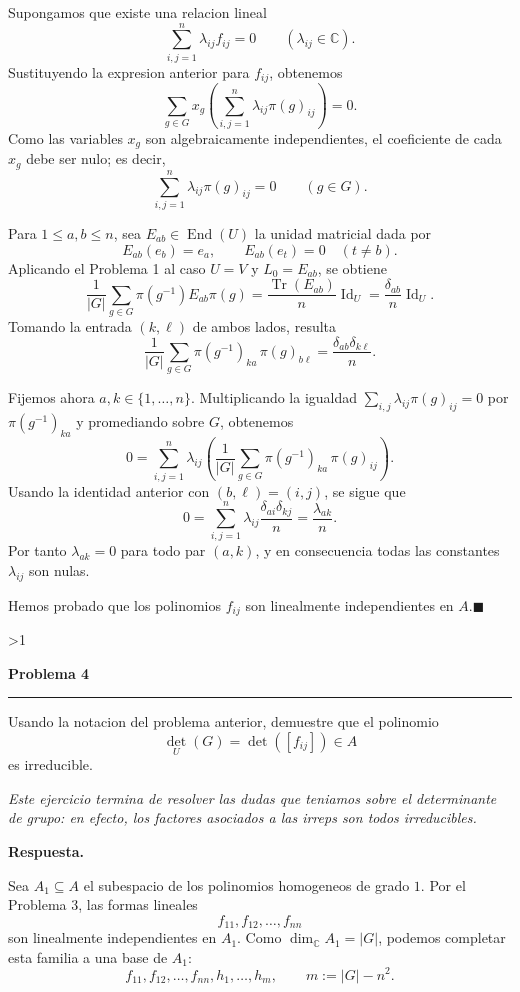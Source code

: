 \documentclass[10pt,a4paper]{article}
\newcommand{\CC}{\mathbb{C}}
\newcommand{\inlinehead}[2][repblue]{%
  \par\smallskip
  {\color{#1}\bfseries #2.}\hspace{0.45em}%
}
\newcommand{\answer}{\inlinehead{Respuesta}}
\newcounter{probcnt}
\newcommand{\problem}[2]{%
  \stepcounter{probcnt}%
  \ifnum\value{probcnt}>1\newpage\fi
  \par\vspace{0.25em}
  {\large\bfseries\color{repblue} Problema #1}\par
  {\color{repline}\rule{\linewidth}{0.55pt}}\par
  \begin{tcolorbox}[
    breakable,
    colback=white,
    colframe=repline,
    borderline west={1.6pt}{0pt}{repteal},
    left=0.7em,
    right=0.7em,
    top=0.35em,
    bottom=0.3em,
    before skip=0.35em,
    after skip=0.45em
  ]
    #2
  \end{tcolorbox}
}
\begin{document}
Supongamos que existe una relacion lineal
\[
  \sum_{i,j=1}^n \lambda_{ij}f_{ij}=0
  \qquad (\lambda_{ij}\in\CC).
\]
Sustituyendo la expresion anterior para $f_{ij}$, obtenemos
\[
  \sum_{g\in G} x_g\left(\sum_{i,j=1}^n \lambda_{ij}\pi(g)_{ij}\right)=0.
\]
Como las variables $x_g$ son algebraicamente independientes, el coeficiente de
cada $x_g$ debe ser nulo; es decir,
\[
  \sum_{i,j=1}^n \lambda_{ij}\pi(g)_{ij}=0
  \qquad (g\in G).
\]

Para $1\le a,b\le n$, sea $E_{ab}\in\operatorname{End}(U)$ la unidad
matricial dada por
\[
  E_{ab}(e_b)=e_a,
  \qquad
  E_{ab}(e_t)=0\quad (t\ne b).
\]
Aplicando el Problema 1 al caso $U=V$ y $L_0=E_{ab}$, se obtiene
\[
  \frac{1}{|G|}\sum_{g\in G}\pi(g^{-1})E_{ab}\pi(g)
  =\frac{\operatorname{Tr}(E_{ab})}{n}\operatorname{Id}_U
  =\frac{\delta_{ab}}{n}\operatorname{Id}_U.
\]
Tomando la entrada $(k,\ell)$ de ambos lados, resulta
\[
  \frac{1}{|G|}\sum_{g\in G}\pi(g^{-1})_{ka}\,\pi(g)_{b\ell}
  =\frac{\delta_{ab}\delta_{k\ell}}{n}.
\]

Fijemos ahora $a,k\in\{1,\dots,n\}$. Multiplicando la igualdad
\(
\sum_{i,j} \lambda_{ij}\pi(g)_{ij}=0
\)
por $\pi(g^{-1})_{ka}$ y promediando sobre $G$, obtenemos
\[
  0
  =\sum_{i,j=1}^n \lambda_{ij}
    \left(\frac{1}{|G|}\sum_{g\in G}\pi(g^{-1})_{ka}\,\pi(g)_{ij}\right).
\]
Usando la identidad anterior con $(b,\ell)=(i,j)$, se sigue que
\[
  0
  =\sum_{i,j=1}^n \lambda_{ij}\frac{\delta_{ai}\delta_{kj}}{n}
  =\frac{\lambda_{ak}}{n}.
\]
Por tanto $\lambda_{ak}=0$ para todo par $(a,k)$, y en consecuencia todas las
constantes $\lambda_{ij}$ son nulas.

Hemos probado que los polinomios $f_{ij}$ son linealmente independientes en
$A$.\hfill$\blacksquare$

\problem{4}{%
Usando la notacion del problema anterior, demuestre que el polinomio
\[
  \det_U(G)=\det([f_{ij}])\in A
\]
es irreducible.

\smallskip
\textit{Este ejercicio termina de resolver las dudas que teniamos sobre el
determinante de grupo: en efecto, los factores asociados a las irreps son todos
irreducibles.}
}

\answer
Sea $A_1\subseteq A$ el subespacio de los polinomios homogeneos de grado $1$.
Por el Problema 3, las formas lineales
\[
  f_{11},f_{12},\dots,f_{nn}
\]
son linealmente independientes en $A_1$. Como $\dim_\CC A_1=|G|$, podemos
completar esta familia a una base de $A_1$:
\[
  f_{11},f_{12},\dots,f_{nn},h_1,\dots,h_m,
  \qquad m:=|G|-n^2.
\]
\end{document}
